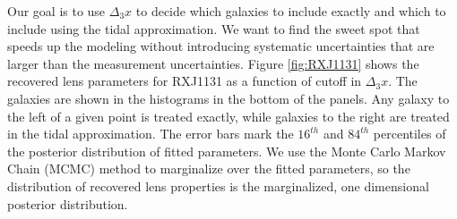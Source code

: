 Our goal is to use $\Delta_3x$ to decide which galaxies to include exactly and which to include using the tidal approximation. We want to find the sweet spot that speeds up the modeling without introducing systematic uncertainties that are larger than the measurement uncertainties.
Figure \ref{fig:RXJ1131} shows the recovered lens parameters for RXJ1131 as a function of cutoff in $\Delta_3x$. The galaxies are shown in the histograms in the bottom of the panels. Any galaxy to the left of a given point is treated exactly, while galaxies to the right are treated in the tidal approximation. The error bars mark the $16^{th}$ and $84^{th}$ percentiles of the posterior distribution of fitted parameters. We use the Monte Carlo Markov Chain (MCMC) method to marginalize over the fitted parameters, so the distribution of recovered lens properties is the marginalized, one dimensional posterior distribution.
  
